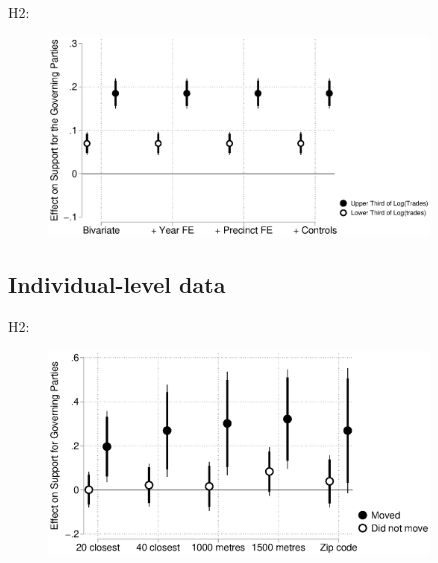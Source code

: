 \documentclass[10pt,aspectratio=169]{beamer}
\begin{document}
\begin{frame}
H2: \\
\centering
\begin{figure}[htbp!]
	\includegraphics[width=0.9\textwidth]{../../figures/localactivity.eps}
\end{figure}
\end{frame}

\subsection{Individual-level data}


\begin{frame}
H2: \\ 
\centering
\begin{figure}[htbp!]
	\includegraphics[width=0.9\textwidth]{../../figures/moving.eps}
\end{figure}
\end{frame}
\end{document}
